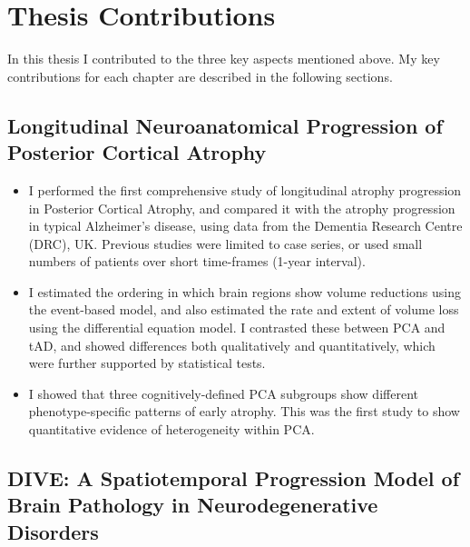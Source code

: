 \section{Thesis Contributions}

In this thesis I contributed to the three key aspects mentioned above. My key contributions for each chapter are described in the following sections.

\subsection{Longitudinal Neuroanatomical Progression of Posterior Cortical Atrophy}

\begin{itemize}
\item I performed the first comprehensive study of longitudinal atrophy progression in Posterior Cortical Atrophy, and compared it with the atrophy progression in typical Alzheimer's disease, using data from the Dementia Research Centre (DRC), UK. Previous studies were limited to case series, or used small numbers of patients over short time-frames (1-year interval).
\item I estimated the ordering in which brain regions show volume reductions using the event-based model, and also estimated the rate and extent of volume loss using the differential equation model. I contrasted these between PCA and tAD, and showed differences both qualitatively and quantitatively, which were further supported by statistical tests.
\item I showed that three cognitively-defined PCA subgroups show different phenotype-specific patterns of early atrophy. This was the first study to show quantitative evidence of heterogeneity within PCA.
\end{itemize}


\subsection{DIVE: A Spatiotemporal Progression Model of Brain Pathology in Neurodegenerative Disorders}

